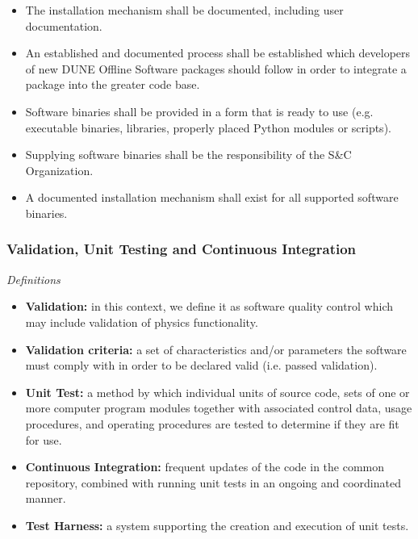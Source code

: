 \begin{itemize}
\item The installation mechanism shall be documented, including user documentation.

\item An established and documented process shall be established which developers of new DUNE Offline Software packages should follow in order to integrate a package into the greater code base.

\item Software binaries shall be provided in a form that is ready to use (e.g. executable binaries, libraries, properly placed Python modules or scripts).

\item Supplying software binaries shall be the responsibility of the S\&C Organization.

\item A documented installation mechanism shall exist for all supported software binaries.
\end{itemize}


\subsubsection{Validation, Unit Testing and Continuous Integration }
\textit{Definitions}

\begin{itemize}
\item \textbf{Validation:} in this context, we define it as software quality control which may include validation of physics functionality.

\item  \textbf{Validation criteria:} a set of characteristics and/or parameters the software must comply with in order to be declared valid (i.e. passed validation).

\item \textbf{Unit Test:} a method by which individual units of source code, sets of one or more computer program modules together with associated control data, usage procedures, and operating procedures are tested to determine if they are fit for use.

\item \textbf{Continuous Integration:} frequent updates of the code in the common repository, combined with running unit tests in an ongoing and coordinated manner.

\item \textbf{Test Harness:} a system supporting the creation and execution of unit tests.


\end{itemize}

